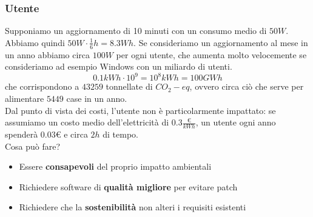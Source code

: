 \subsubsection{Utente}
Supponiamo un aggiornamento di 10 minuti con un consumo medio di $50W$. Abbiamo quindi $50W \cdot \frac{1}{6}h = 8.3 Wh$. Se consideriamo un aggiornamento al mese in un anno abbiamo circa $100W$ per ogni utente, che aumenta molto velocemente se consideriamo ad esempio Windows con un miliardo di utenti.
\begin{equation*}
	0.1kWh \cdot 10^9 = 10^8kWh = 100GWh
\end{equation*}
che corrispondono a $43259$ tonnellate di $CO_2-eq$, ovvero circa ciò che serve per alimentare $5449$ case in un anno.\\
Dal punto di vista dei costi, l'utente non è particolarmente impattato: se assumiamo un costo medio dell'elettricità di $0.3 \frac{€}{kWh}$, un utente ogni anno spenderà $0.03€$ e circa $2h$ di tempo.\\
Cosa può fare?
\begin{itemize}
	\item Essere \textbf{consapevoli} del proprio impatto ambientali
	\item Richiedere software di \textbf{qualità migliore} per evitare patch
	\item Richiedere che la \textbf{sostenibilità} non alteri i requisiti esistenti
\end{itemize}

